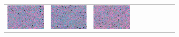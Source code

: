 \documentclass{ipol}
\begin{document}
\begin{figure}[ht]
\begin{subfigure}[t]{\linewidth}
\begin{tabular}{ccccccccc}
                \includegraphics[width=\s]{images/flowers/DCB/iso_n10_64_grids.png}&
                \includegraphics[width=\s]{images/flowers/DHT/iso_n10_64_grids.png}&
                \includegraphics[width=\s]{images/flowers/LINEAR/iso_n10_64_grids.png}&

\end{tabular}
\end{subfigure}
\end{figure}
\end{document}
